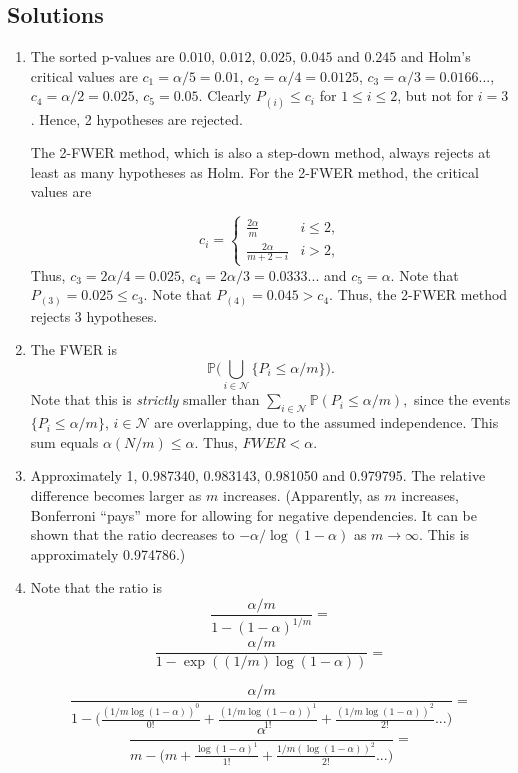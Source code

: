 \documentclass[11pt]{article}
\theoremstyle{plain}
\theoremstyle{definition}
\newcommand{\N}{\mathcal{N}}
\newcommand{\pr}{\mathbb{P}}
\begin{document}
\begin{sols}

\subsection{Solutions}
\begin{enumerate}

\item
The sorted p-values are $0.010$, $0.012$,  $0.025$, $0.045$ and $0.245$ and Holm's critical values are $c_1=\alpha/5=0.01$, $c_2=\alpha/4=0.0125$, $c_3=\alpha/3=0.0166...$, $c_4=\alpha/2=0.025$, $c_5=0.05$. Clearly $P_{(i)}\leq c_i$ for  $1\leq i \leq 2$, but not for $i=3$. Hence, 2 hypotheses are rejected.

The 2-FWER method, which is also a step-down method,  always rejects at least as many hypotheses as Holm.
For the 2-FWER method, the critical values are 

\begin{equation}
c_i=
 \begin{cases}
\frac{2\alpha}{m}& i\leq 2, \\
\frac{2\alpha}{m+2-i} & i>2,
\end{cases}
\end{equation}
Thus, $c_3=2\alpha/4=0.025$, $c_4=2\alpha/3=0.0333...$ and $c_5=\alpha$. Note that $P_{(3)}=0.025\leq c_3.$
Note that $P_{(4)}=0.045>c_4$. Thus,  the 2-FWER method rejects  3 hypotheses.


\item The FWER is $$\pr\big(\bigcup_{i\in \N}\{P_i\leq \alpha/m\}\big).$$
Note that this is \emph{strictly} smaller than 
$\sum_{i\in \N} \pr(P_i\leq \alpha/m),$ since the events $\{ P_i\leq \alpha/m \}$, $i \in \N$ are overlapping, due to the assumed independence. This sum equals $\alpha(N/m)\leq \alpha$. Thus, $FWER<\alpha$.


\item
Approximately 1, 0.987340, 0.983143,  0.981050 and  0.979795. The relative difference becomes larger as $m$ increases. (Apparently, as $m$ increases, Bonferroni ``pays'' more for allowing for negative dependencies. It can be shown that the ratio decreases to $-\alpha/\log(1-\alpha)$ as $m\rightarrow \infty$. This is approximately 0.974786.)

\item 
Note that the ratio is 
$$\frac{\alpha/m}{1-(1-\alpha)^{1/m}}=$$
$$\frac{\alpha/m}{1-\exp((1/m)\log(1-\alpha))}=$$

$$
\frac{\alpha/m}{
1  - \big(    \frac{(1/m\log(1-\alpha))^0}{0!}  + \frac{(1/m\log(1-\alpha))^1}{1!} +  \frac{(1/m\log(1-\alpha))^2}{2!}...\big)  }=$$
$$  \frac{\alpha}{
m  - \big(    m  +   \frac{\log(1-\alpha)^1}{1!} +  \frac{1/m(\log(1-\alpha))^2}{2!}...\big)  } =$$


\end{enumerate}
\end{sols}
\end{document}
